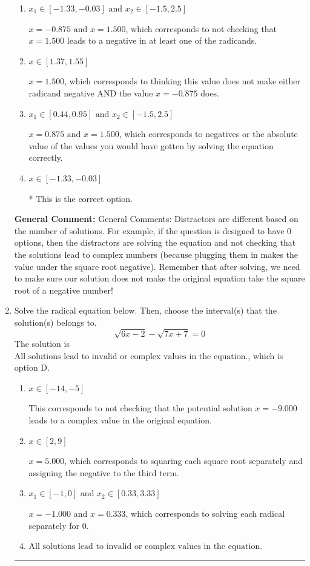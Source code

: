 \documentclass{extbook}[14pt]
\newcommand{\litem}[1]{\item #1

\rule{\textwidth}{0.4pt}}
\begin{document}
\begin{enumerate}
{\begin{enumerate}[label=\Alph*.]
This corresponds to believing both $x = -0.875 \text{ and } x = 1.500$ both lead to complex values.
\item \( x_1 \in [-1.33, -0.03] \text{ and } x_2 \in [-1.5,2.5] \)

$x = -0.875 \text{ and } x = 1.500$, which corresponds to not checking that $x = 1.500$ leads to a negative in at least one of the radicands.
\item \( x \in [1.37,1.55] \)

$x = 1.500$, which corresponds to thinking this value does not make either radicand negative AND the value $x = -0.875$ does.
\item \( x_1 \in [0.44, 0.95] \text{ and } x_2 \in [-1.5,2.5] \)

$x = 0.875 \text{ and } x = 1.500$, which corresponds to negatives or the absolute value of the values you would have gotten by solving the equation correctly.
\item \( x \in [-1.33,-0.03] \)

* This is the correct option.
\end{enumerate}

\textbf{General Comment:} General Comments: Distractors are different based on the number of solutions. For example, if the question is designed to have 0 options, then the distractors are solving the equation and not checking that the solutions lead to complex numbers (because plugging them in makes the value under the square root negative). Remember that after solving, we need to make sure our solution does not make the original equation take the square root of a negative number!
}
\litem{
Solve the radical equation below. Then, choose the interval(s) that the solution(s) belongs to.
\[ \sqrt{6 x - 2} - \sqrt{7 x + 7} = 0 \]The solution is \( \text{All solutions lead to invalid or complex values in the equation.} \), which is option D.\begin{enumerate}[label=\Alph*.]
\item \( x \in [-14,-5] \)

This corresponds to not checking that the potential solution $x = -9.000$ leads to a complex value in the original equation.
\item \( x \in [2,9] \)

$x = 5.000$, which corresponds to squaring each square root separately and assigning the negative to the third term.
\item \( x_1 \in [-1, 0] \text{ and } x_2 \in [0.33,3.33] \)

$x = -1.000$ and $x = 0.333$, which corresponds to solving each radical separately for 0.
\item \( \text{All solutions lead to invalid or complex values in the equation.} \)


\end{enumerate}}
\end{enumerate}
\end{document}
